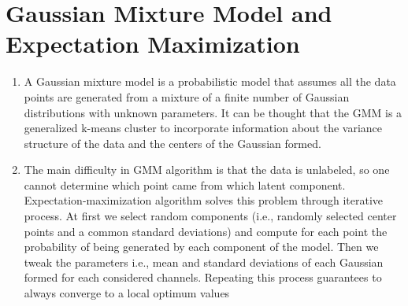 \documentclass{article}
\begin{document}
\section{Gaussian Mixture Model and Expectation Maximization}

\begin{enumerate}
    \item  A Gaussian mixture model is a probabilistic model that assumes all the data points are generated from
a mixture of a finite number of Gaussian distributions with unknown parameters. It can be thought
that the GMM is a generalized k-means cluster to incorporate information about the variance structure
of the data and the centers of the Gaussian formed.
    \item The main difficulty in GMM algorithm is that the data is unlabeled, so one cannot determine which
point came from which latent component. Expectation-maximization algorithm solves this problem
through iterative process. At first we select random components (i.e., randomly selected center points
and a common standard deviations) and compute for each point the probability of being generated
by each component of the model. Then we tweak the parameters i.e., mean and standard deviations
of each Gaussian formed for each considered channels. Repeating this process guarantees to always
converge to a local optimum values

\end{enumerate}
\end{document}
